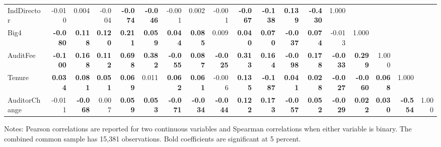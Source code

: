 \begin{table}[p]
{\begin{tabular}{lrrrrrrrrrrrrrrrrr}
IndDirector & -0.010 & 0.004 & -0.004 & \textbf{-0.074} & \textbf{-0.046} & -0.001 & 0.002 & -0.001 & \textbf{-0.067} & \textbf{-0.138} & \textbf{0.139} & \textbf{-0.430} & 1.000 &  &  &  & \\
Big4 & \textbf{-0.080} & \textbf{0.118} & \textbf{0.120} & \textbf{0.211} & \textbf{0.059} & \textbf{0.044} & \textbf{0.085} & 0.009 & \textbf{0.040} & \textbf{0.070} & \textbf{-0.037} & \textbf{0.074} & -0.013 & 1.000 &  &  & \\
AuditFee & \textbf{-0.100} & \textbf{0.168} & \textbf{0.112} & \textbf{0.698} & \textbf{0.382} & \textbf{-0.055} & \textbf{0.087} & \textbf{-0.025} & \textbf{0.313} & \textbf{0.164} & \textbf{-0.098} & \textbf{0.178} & \textbf{-0.033} & \textbf{0.299} & 1.000 &  & \\
Tenure & \textbf{0.034} & \textbf{0.081} & \textbf{0.051} & \textbf{0.069} & 0.011 & \textbf{0.062} & \textbf{0.061} & -0.006 & \textbf{0.135} & \textbf{-0.187} & \textbf{0.041} & \textbf{0.028} & \textbf{-0.027} & \textbf{-0.060} & \textbf{0.068} & 1.000 & \\
AuditorChange & -0.011 & \textbf{-0.068} & 0.007 & \textbf{0.059} & \textbf{0.053} & \textbf{-0.071} & \textbf{-0.034} & \textbf{-0.044} & \textbf{0.122} & \textbf{0.173} & \textbf{-0.057} & \textbf{0.052} & \textbf{-0.029} & \textbf{0.022} & \textbf{0.030} & \textbf{-0.554} & 1.000\\
\hline\end{tabular}}
\begin{minipage}{0.98\textwidth}\footnotesize Notes: Pearson correlations are reported for two continuous variables and Spearman correlations when either variable is binary. The combined common sample has 15,381 observations. Bold coefficients are significant at 5 percent.\end{minipage}
\end{table}